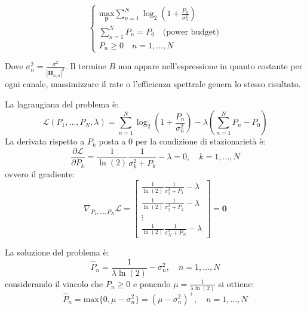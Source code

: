 \[
    \begin{cases}
       \underset{\mathbf{p}}{\text{max}} \sum_{n=1}^{N} \log_2(1 + \frac{P_n}{\sigma_n^2}) \\
       \sum_{n=1}^{N} P_n = P_0 \quad \text{(power budget)} \\
        P_n \geq 0 \quad n = 1, \ldots, N
    \end{cases}    
\]

Dove $\sigma_n^2 = \frac{\sigma^2}{\left| \mathbf{H}_{n, n} \right| ^2}$. Il termine $B$ non appare nell'espressione in quanto costante per ogni canale, massimizzare il rate o l'efficienza spettrale genera lo stesso risultato.

La lagrangiana del problema è:
\[
    \mathcal{L}(P_1, \hdots, P_N, \lambda ) = \sum_{n=1}^{N} \log_2(1 + \frac{P_n}{\sigma_n^2}) - \lambda \left( \sum_{n=1}^{N} P_n - P_0 \right)
\]
La derivata rispetto a $P_k$ posta a 0 per la condizione di stazionarietà è:
\[
    \frac{\partial \mathcal{L}}{\partial P_k} = \frac{1}{\ln(2)} \frac{1}{\sigma_k^2 + P_k} - \lambda = 0, \quad k = 1, \ldots, N
\]
ovvero il gradiente:
\[
    \nabla_{P_1, \hdots, P_N} \mathcal{L} = \begin{bmatrix}
        \frac{1}{\ln(2)} \frac{1}{\sigma_1^2 + P_1} - \lambda \\
        \frac{1}{\ln(2)} \frac{1}{\sigma_2^2 + P_2} - \lambda \\
        \vdots \\
        \frac{1}{\ln(2)} \frac{1}{\sigma_N^2 + P_N} - \lambda
\end{bmatrix} = \mathbf{0}
\]

La soluzione del problema è:
\[
    \hat{P}_n = \frac{1}{\lambda \ln(2)} - \sigma_n^2, \quad n = 1, \ldots, N
\]
considerando il vincolo che $P_n \geq 0$ e ponendo $\mu = \frac{1}{\lambda \ln(2)}$ si ottiene:
\[
    \hat{P}_n = \text{max} \{ 0, \mu - \sigma_n^2    \} = (\mu - \sigma_n^2)^+, \quad n = 1, \ldots, N
\]


